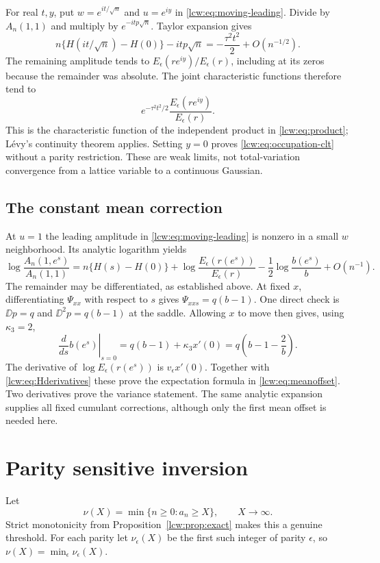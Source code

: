 \documentclass[11pt,letterpaper]{article}
\theoremstyle{remark}\newtheorem{remark}[theorem]{Remark}
\begin{document}
For real $t,y$, put $w=e^{it/\sqrt n}$ and $u=e^{iy}$ in \eqref{lcw:eq:moving-leading}. Divide by $A_n(1,1)$ and multiply by $e^{-itp\sqrt n}$. Taylor expansion gives
\[
 n\{H(it/\sqrt n)-H(0)\}-itp\sqrt n
 =-\frac{\tau^2t^2}{2}+O(n^{-1/2}).
\]
The remaining amplitude tends to $E_\epsilon(re^{iy})/E_\epsilon(r)$, including at its zeros because the remainder was absolute. The joint characteristic functions therefore tend to
\[
 e^{-\tau^2t^2/2}\frac{E_\epsilon(re^{iy})}{E_\epsilon(r)}.
\]
This is the characteristic function of the independent product in \eqref{lcw:eq:product}; L\'evy's continuity theorem applies. Setting $y=0$ proves \eqref{lcw:eq:occupation-clt} without a parity restriction. These are weak limits, not total-variation convergence from a lattice variable to a continuous Gaussian.

\subsection{The constant mean correction}
At $u=1$ the leading amplitude in \eqref{lcw:eq:moving-leading} is nonzero in a small $w$ neighborhood. Its analytic logarithm yields
\[
 \log\frac{A_n(1,e^s)}{A_n(1,1)}
 =n\{H(s)-H(0)\}
 +\log\frac{E_\epsilon(r(e^s))}{E_\epsilon(r)}
 -\frac12\log\frac{b(e^s)}b+O(n^{-1}).
\]
The remainder may be differentiated, as established above. At fixed $x$, differentiating $\Psi_{xx}$ with respect to $s$ gives
$\Psi_{xxs}=q(b-1)$. One direct check is
$\DD p=q$ and $\DD^2p=q(b-1)$ at the saddle. Allowing $x$ to move then gives, using $\kappa_3=2$,
\[
 \left.\frac d{ds}b(e^s)\right|_{s=0}
 =q(b-1)+\kappa_3x'(0)=q\left(b-1-\frac2b\right).
\]
The derivative of $\log E_\epsilon(r(e^s))$ is $v_\epsilon x'(0)$. Together with \eqref{lcw:eq:Hderivatives} these prove the expectation formula in \eqref{lcw:eq:meanoffset}. Two derivatives prove the variance statement. The same analytic expansion supplies all fixed cumulant corrections, although only the first mean offset is needed here.

\section{Parity sensitive inversion}\label{lcw:sec:inverse}
Let
\[
 \nu(X)=\min\{n\ge0:a_n\ge X\},\qquad X\to\infty.
\]
Strict monotonicity from Proposition~\ref{lcw:prop:exact} makes this a genuine threshold. For each parity let $\nu_\epsilon(X)$ be the first such integer of parity $\epsilon$, so $\nu(X)=\min_\epsilon\nu_\epsilon(X)$.
\end{document}
